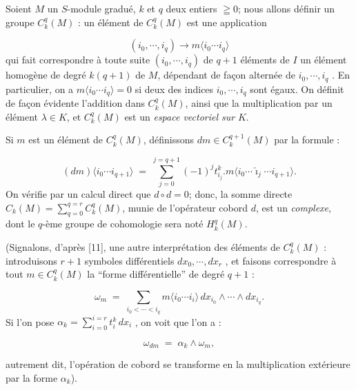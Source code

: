 Soient $M$ un $S$-module gradué, $k$ et $q$ deux entiers $\geqq 0$; nous allons définir un groupe $C^q_k(M)$ : un élément de $C^q_k(M)$ est une application

\begin{equation*}
(i_0 , \cdots , i_q) \to m\langle i_0 \cdots i_q \rangle
\end{equation*}
qui fait correspondre à toute suite $(i_0 , \cdots , i_q)$ de $q + 1$ éléments de $I$ un élément homogène de degré $k(q + 1)$ de $M$, dépendant de façon alternée de $i_0 , \cdots , i_q$ . En particulier, on a $m\langle i_0 \cdots i_q \rangle = 0$ si deux des indices $i_0 , \cdots , i_q$ sont égaux. On définit de façon évidente l'addition dans $C^q_k(M)$, ainsi que la multiplication par un élément $\lambda \in K$, et $C^q_k(M)$ est un \textit{espace vectoriel sur} $K$.

Si $m$ est un élément de $C^q_k(M)$, définissons $dm \in C^{q+1}_k(M)$ par la formule :

\begin{equation*}
(dm)\langle i_0 \cdots i_{q+1} \rangle \;=\; \sum_{j=0}^{j=q+1} (-1)^j t^k_{i_j}.m\langle i_0 \cdots \hat{\imath}_j \cdots i_{q+1} \rangle.
\end{equation*}
On vérifie par un calcul direct que $d \circ d = 0$; donc, la somme directe $C_k(M) = \sum_{q=0}^{q=r} C^q_k(M)$, munie de l'opérateur cobord $d$, est un \textit{complexe}, dont le $q$-ème groupe de cohomologie sera noté $H^q_k(M)$.

(Signalons, d'après [11], une autre interprétation des éléments de $C^q_k(M)$ : introduisons $r + 1$ symboles différentiels $dx_0 , \cdots , dx_r$ , et faisons correspondre à tout $m \in C^q_k(M)$ la ``forme différentielle'' de degré $q + 1$ :

\begin{equation*}
\omega_m \;=\; \sum_{i_0<\cdots<i_q} m\langle i_0 \cdots i_i \rangle \, dx_{i_0} \wedge \cdots \wedge dx_{i_q} .
\end{equation*}
Si l'on pose $\alpha_k = \sum_{i=0}^{i=r} t^k_i \, dx_i$ , on voit que l'on a :

\begin{equation*}
\omega_{dm} \;=\; \alpha_k \wedge \omega_m ,
\end{equation*}


 autrement dit, l'opération de cobord se transforme en la multiplication extérieure par la forme $\alpha_k$).

